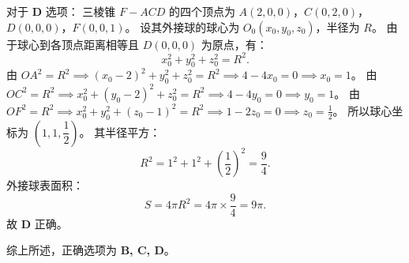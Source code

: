{  对于 \textbf{D} 选项：
  三棱锥 $F - ACD$ 的四个顶点为 $A(2,0,0)$，$C(0,2,0)$，$D(0,0,0)$，$F(0,0,1)$。
  设其外接球的球心为 $O_0(x_0, y_0, z_0)$，半径为 $R$。
  由于球心到各顶点距离相等且 $D(0,0,0)$ 为原点，有：
  \[ x_0^2 + y_0^2 + z_0^2 = R^2. \]
  由 $OA^2 = R^2 \implies (x_0 - 2)^2 + y_0^2 + z_0^2 = R^2 \implies 4 - 4x_0 = 0 \implies x_0 = 1$。
  由 $OC^2 = R^2 \implies x_0^2 + (y_0 - 2)^2 + z_0^2 = R^2 \implies 4 - 4y_0 = 0 \implies y_0 = 1$。
  由 $OF^2 = R^2 \implies x_0^2 + y_0^2 + (z_0 - 1)^2 = R^2 \implies 1 - 2z_0 = 0 \implies z_0 = \frac{1}{2}$。
  所以球心坐标为 $\left(1, 1, \dfrac{1}{2}\right)$。
  其半径平方：
  \[ R^2 = 1^2 + 1^2 + \left(\frac{1}{2}\right)^2 = \frac{9}{4}. \]
  外接球表面积：
  \[ S = 4\pi R^2 = 4\pi \times \frac{9}{4} = 9\pi. \]
  故 \textbf{D} 正确。
  
  综上所述，正确选项为 \textbf{B, C, D}。
}

\newcommand{\qSolidCubeDynamicSphereDiagnosis}{%
  学生得分率为 50.0\%。说明学生对立体几何的动态面判定、表面爬行展开最值、等体积转换以及外接球求法这几个立体几何综合大模块，存在思维不够全面或者公式掌握不够扎实的问题。
}

\newcommand{\qSolidCubeDynamicSphereTeachingNotes}{%
  \item \textbf{难点剖析}：
    \begin{itemize}
      \item A 选项：演示如何通过空间向量法（求平面法向量）把线面平行转化为向量垂直方程，算出 $x=1$ 的物理含义；
      \item B 选项：讲解蚂蚁爬行表面展开的“剪开”原理，画出平面展开直角三角形；
      \item C 选项：强调等体积转换法把动点 $P$ 所在底面移到高，简化体积计算；
      \item D 选项：通过空间直角坐标系建立关于球心坐标的方程组，是求不规则四面体外接球最稳定、最通用的方法。
    \end{itemize}
}


\newcommand{\qTJWCubeDynamicSphereStem}{\qSolidCubeDynamicSphereStem}
\newcommand{\qTJWCubeDynamicSphereOptions}{\qSolidCubeDynamicSphereOptions}
\newcommand{\qTJWCubeDynamicSphereFigure}[1][1.2]{\qSolidCubeDynamicSphereFigure[#1]}
\newcommand{\qTJWCubeDynamicSphereAnswer}{\qSolidCubeDynamicSphereAnswer}
\newcommand{\qTJWCubeDynamicSphereSolution}{\qSolidCubeDynamicSphereSolution}
\newcommand{\qTJWCubeDynamicSphereDiagnosis}{\qSolidCubeDynamicSphereDiagnosis}
\newcommand{\qTJWCubeDynamicSphereTeachingNotes}{\qSolidCubeDynamicSphereTeachingNotes}
